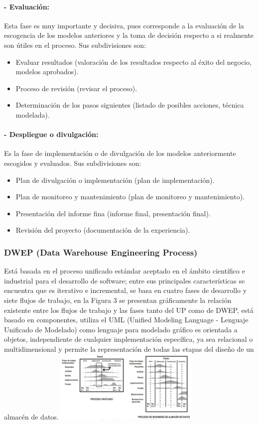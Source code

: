 \documentclass[twoside,twocolumn]{article}
\begin{document}
\paragraph{- Evaluación:}
Esta fase es muy importante y decisiva, pues corresponde a 
la evaluación de la escogencia de los modelos anteriores y la toma de 
decisión respecto a si realmente son útiles en el proceso. Sus 
subdivisiones son: 
\begin{itemize}
    \item Evaluar resultados (valoración de los resultados respecto al éxito del negocio, modelos aprobados).
    \item Proceso de revisión (revisar el proceso).
    \item Determinación de los pasos siguientes (listado de posibles acciones, técnica modelada).  
\end{itemize}

\paragraph{- Despliegue o divulgación:}
Es la fase de implementación o de 
divulgación de los modelos anteriormente escogidos y evaluados. Sus 
subdivisiones son: 

\begin{itemize}
    \item Plan de divulgación o implementación (plan de implementación).
    \item Plan de monitoreo y mantenimiento (plan de monitoreo y mantenimiento).
    \item Presentación del informe fina (informe final, presentación final).
    \item Revisión del proyecto (documentación de la experiencia). 
\end{itemize}
\subsubsection{DWEP (Data Warehouse Engineering Process)}
Está basada en el proceso unificado 
estándar aceptado en el ámbito científico e industrial para el desarrollo de software; entre sus principales características se encuentra que es iterativo e incremental, se basa en cuatro fases de desarrollo y siete flujos de trabajo, en la Figura 3 se presentan gráficamente la relación existente entre los flujos de trabajo y las fases tanto del UP como de DWEP, está basado en componentes, utiliza el UML (Unified Modeling Language - Lenguaje Unificado de Modelado) como lenguaje para modelado gráfico es orientada a objetos, independiente de cualquier implementación específica, ya sea relacional o multidimensional y permite la representación de todas las etapas del diseño de un almacén de datos. 
\includegraphics[width=7cm]{imagenes/img4.png}
\end{document}
